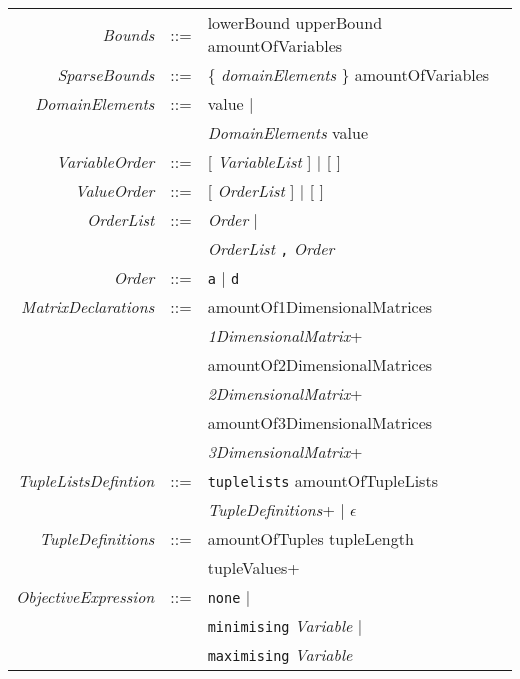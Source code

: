 \documentclass{article}
\begin{document}
\begin{small}
\begin{tabular}{rcl}
 \textit{Bounds}& ::= & lowerBound upperBound amountOfVariables\\ 

 \textit{SparseBounds}& ::= & \{ \textit{domainElements} \} amountOfVariables \\

\textit{DomainElements}& ::= & value $\mid$ \\
                       &   & \textit{DomainElements} value \\

\textit{VariableOrder} & ::= & [ \textit{VariableList} ] $\mid$ [ ]\\

\textit{ValueOrder} & ::= & [ \textit{OrderList} ]  $\mid$ [ ]\\

\textit{OrderList} & ::= & \textit{Order} $\mid$ \\
                   &      & \textit{OrderList} \texttt{,} \textit{Order} \\

\textit{Order} &  ::= & \texttt{a}  $\mid$ \texttt{d} \\

\textit{MatrixDeclarations} & ::= & amountOf1DimensionalMatrices \\
                           &     & \textit{1DimensionalMatrix}+ \\
                           &     & amountOf2DimensionalMatrices \\
                           &     & \textit{2DimensionalMatrix}+ \\
                           &     & amountOf3DimensionalMatrices \\
                           &     & \textit{3DimensionalMatrix}+ \\

\textit{TupleListsDefintion}& ::= & \texttt{tuplelists} amountOfTupleLists \\
                            &     & \textit{TupleDefinitions}+ $\mid$ $\epsilon$\\

\textit{TupleDefinitions} & ::= & amountOfTuples tupleLength  \\
                          &     & tupleValues+  \\

\textit{ObjectiveExpression}& ::= & \texttt{none} $\mid$ \\
                            &     & \texttt{minimising} \textit{Variable} $\mid$ \\
                            &     & \texttt{maximising} \textit{Variable} \\


\end{tabular}
\end{small}
\end{document}
